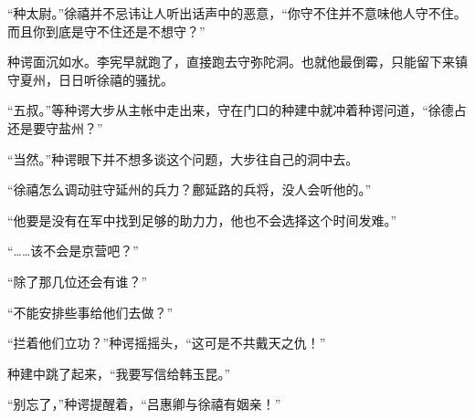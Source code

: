 “种太尉。”徐禧并不忌讳让人听出话声中的恶意，“你守不住并不意味他人守不住。而且你到底是守不住还是不想守？”

种谔面沉如水。李宪早就跑了，直接跑去守弥陀洞。也就他最倒霉，只能留下来镇守夏州，日日听徐禧的骚扰。

“五叔。”等种谔大步从主帐中走出来，守在门口的种建中就冲着种谔问道，“徐德占还是要守盐州？”

“当然。”种谔眼下并不想多谈这个问题，大步往自己的洞中去。

“徐禧怎么调动驻守延州的兵力？鄜延路的兵将，没人会听他的。”

“他要是没有在军中找到足够的助力力，他也不会选择这个时间发难。”

“……该不会是京营吧？”

“除了那几位还会有谁？”

“不能安排些事给他们去做？”

“拦着他们立功？”种谔摇摇头，“这可是不共戴天之仇！”

种建中跳了起来，“我要写信给韩玉昆。”

“别忘了，”种谔提醒着，“吕惠卿与徐禧有姻亲！”

